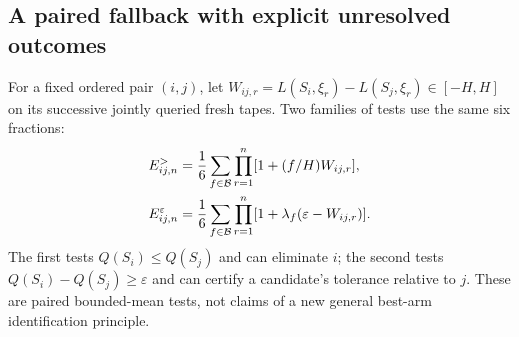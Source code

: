 \documentclass[preprint,11pt,sort&compress]{elsarticle}
\begin{document}
\subsection{A paired fallback with explicit unresolved outcomes}
For a fixed ordered pair $(i,j)$, let
$W_{ij,r}=L(S_i,\xi_r)-L(S_j,\xi_r)\in[-H,H]$ on its successive jointly
queried fresh tapes. Two families of tests use the same six fractions:
\begin{align}
 E^{>}_{ij,n}&=\frac1{6}\sum_{f\in\mathcal B}
        \prod_{r=1}^n[1+(f/H)W_{ij,r}],\notag\\
 E^{\varepsilon}_{ij,n}&=\frac1{6}\sum_{f\in\mathcal B}
        \prod_{r=1}^n[1+\lambda_f(\varepsilon-W_{ij,r})].
 \label{eq:paired_bets}
\end{align}
The first tests $Q(S_i)\le Q(S_j)$ and can eliminate $i$; the second tests
$Q(S_i)-Q(S_j)\ge\varepsilon$ and can certify a candidate's tolerance
relative to $j$. These are paired bounded-mean tests, not claims of a new
general best-arm identification principle.
\end{document}
